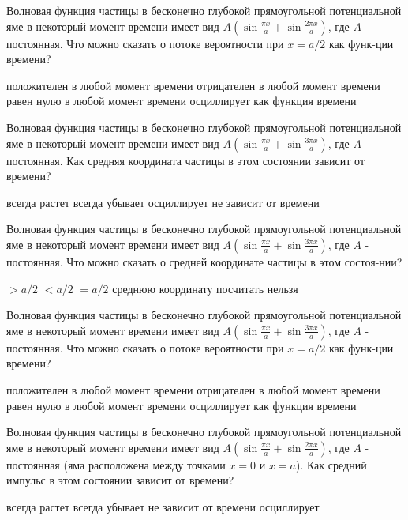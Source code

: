 \documentclass[11pt,a4paper]{exam}
\begin{document}
\begin{questions}
\question Волновая функция частицы в бесконечно глубокой прямоугольной потенциальной яме в некоторый момент времени имеет вид $A\left( {\sin \frac{{\pi x}}{a} + \sin \frac{{2\pi x}}{a}} \right)$, где $A$ - постоянная. Что можно сказать о потоке вероятности при $x = a/2$ как функ-ции времени?
\begin{choices}
\choice положителен в любой момент времени     
\choice отрицателен в любой момент времени
\choice равен нулю в любой момент времени      
\choice осциллирует как функция времени
\end{choices}

\question Волновая функция частицы в бесконечно глубокой прямоугольной потенциальной яме в некоторый момент времени имеет вид $A\left( {\sin \frac{{\pi x}}{a} + \sin \frac{{3\pi x}}{a}} \right)$, где $A$ - постоянная. Как средняя координата частицы в этом состоянии зависит от времени?
\begin{choices}
\choice всегда растет        
\choice всегда убывает
\choice осциллирует       
\choice не зависит от времени
\end{choices}

\question Волновая функция частицы в бесконечно глубокой прямоугольной потенциальной яме в некоторый момент времени имеет вид $A\left( {\sin \frac{{\pi x}}{a} + \sin \frac{{3\pi x}}{a}} \right)$, где $A$ - постоянная. Что можно сказать о средней координате частицы в этом состоя-нии?
\begin{choices}
\choice $ > a/2$ 
\choice $ < a/2$ 
\choice $ = a/2$ 
\choice среднюю координату посчитать нельзя
\end{choices}

\question Волновая функция частицы в бесконечно глубокой прямоугольной потенциальной яме в некоторый момент времени имеет вид $A\left( {\sin \frac{{\pi x}}{a} + \sin \frac{{3\pi x}}{a}} \right)$, где $A$ - постоянная. Что можно сказать о потоке вероятности при $x = a/2$ как функ-ции времени?
\begin{choices}
\choice положителен в любой момент времени     
\choice отрицателен в любой момент времени
\choice равен нулю в любой момент времени      
\choice осциллирует как функция времени
\end{choices}

\question Волновая функция частицы в бесконечно глубокой прямоугольной потенциальной яме в некоторый момент времени имеет вид $A\left( {\sin \frac{{\pi x}}{a} + \sin \frac{{2\pi x}}{a}} \right)$, где $A$ - постоянная (яма расположена между точками $x = 0$ и $x = a$). Как средний импульс в этом состоянии зависит от времени?
\begin{choices}
\choice всегда растет  
\choice всегда убывает 
\choice не зависит от времени   
\choice осциллирует
\end{choices}


\end{questions}
\end{document}
